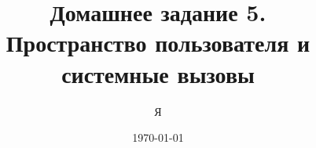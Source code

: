 \documentclass[12pt,a4paper,oneside]{article}
\title{Домашнее задание 5. \\ Пространство пользователя и системные вызовы}
\author{Я}
\date{\today}
\begin{document}
  \sloppy
  \maketitle
  \tableofcontents
  \clearpage

  
  
  
  

\end{document}
